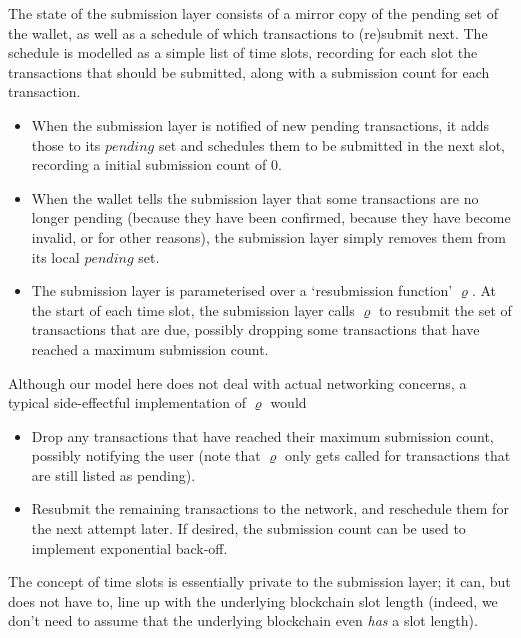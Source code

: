 \documentclass{article}
\theoremstyle{definition}{
  \newtheorem{lemma}{Lemma}[section] %
  \newtheorem{definition}[lemma]{Definition}
}
\theoremstyle{theorem}{
  \newtheorem{invariant}[lemma]{Invariant}
  \newtheorem{proofobligation}[lemma]{Proof Obligation}
}
\numberwithin{equation}{lemma}
\begin{document}
The state of the submission layer consists of a mirror copy of the pending set
of the wallet, as well as a schedule of which transactions to (re)submit next.
The schedule is modelled as a simple list of time slots, recording for each slot
the transactions that should be submitted, along with a submission count for
each transaction.
%
\begin{itemize}
\item When the submission layer is notified of new pending transactions,
it adds those to its $\mathit{pending}$ set and schedules them to be submitted
in the next slot, recording a initial submission count of 0.
\item When the wallet tells the submission layer that some transactions are
no longer pending (because they have been confirmed, because they have become
invalid, or for other reasons), the submission layer simply removes them
from its local $\mathit{pending}$ set.
\item The submission layer is parameterised over a `resubmission function'
$\varrho$. At the start of each time slot, the submission layer calls $\varrho$
to resubmit the set of transactions that are due, possibly dropping some
transactions that have reached a maximum submission count.
\end{itemize}

Although our model here does not deal with actual networking concerns, a
typical side-effectful implementation of $\varrho$ would
%
\begin{itemize}
\item Drop any transactions that have reached their maximum submission
count, possibly notifying the user
(note that $\varrho$ only gets called for transactions that are still listed as
pending).
\item Resubmit the remaining transactions to the network, and reschedule them
for the next attempt later. If desired, the submission count can be used to
implement exponential back-off.
\end{itemize}

The concept of time slots is essentially private to the submission layer; it
can, but does not have to, line up with the underlying blockchain slot length
(indeed, we don't need to assume that the underlying blockchain even \emph{has}
a slot length).
\end{document}
